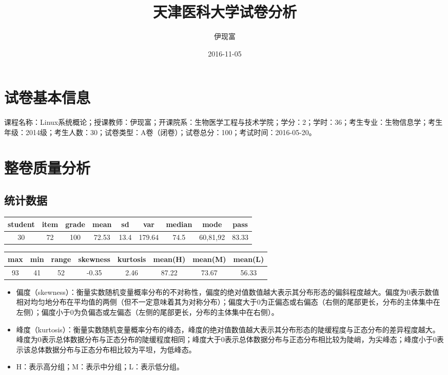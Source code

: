 \documentclass[hyperref,adobefonts]{ctexart}
\title{天津医科大学试卷分析}
\author{伊现富}
\date{2016-11-05}
\providecommand{\tightlist}{\setlength{\itemsep}{0pt}\setlength{\parskip}{0pt}}
\begin{document}
\maketitle

{
\setcounter{tocdepth}{2}
\tableofcontents
}
\section{试卷基本信息}

课程名称：Linux系统概论；授课教师：伊现富；开课院系：生物医学工程与技术学院；学分：2；学时：36；考生专业：生物信息学；考生年级：2014级；考生人数：30；试卷类型：A卷（闭卷）；试卷总分：100；考试时间：2016-05-20。

\section{整卷质量分析}

\subsection{统计数据}

\begin{longtable}{c|c|c|c|c|c|c|c|c}
\hline
student & item & grade & mean & sd & var & median & mode & pass\\
\hline
30 & 72 & 100 & 72.53 & 13.4 & 179.64 & 74.5 & 60,81,92 & 83.33\\
\hline
\end{longtable}

\begin{longtable}{c|c|c|c|c|c|c|c}
\hline
max & min & range & skewness & kurtosis & mean(H) & mean(M) & mean(L)\\
\hline
93 & 41 & 52 & -0.35 & 2.46 & 87.22 & 73.67 & 56.33\\
\hline
\end{longtable}

\begin{itemize}
\tightlist
\item
  偏度（skewness）：衡量实数随机变量概率分布的不对称性，偏度的绝对值数值越大表示其分布形态的偏斜程度越大。偏度为0表示数值相对均匀地分布在平均值的两侧（但不一定意味着其为对称分布）；偏度大于0为正偏态或右偏态（右侧的尾部更长，分布的主体集中在左侧）；偏度小于0为负偏态或左偏态（左侧的尾部更长，分布的主体集中在右侧）。
\item
  峰度（kurtosis）：衡量实数随机变量概率分布的峰态，峰度的绝对值数值越大表示其分布形态的陡缓程度与正态分布的差异程度越大。峰度为0表示总体数据分布与正态分布的陡缓程度相同；峰度大于0表示总体数据分布与正态分布相比较为陡峭，为尖峰态；峰度小于0表示该总体数据分布与正态分布相比较为平坦，为低峰态。
\item
  H：表示高分组；M：表示中分组；L：表示低分组。
\end{itemize}
\end{document}
